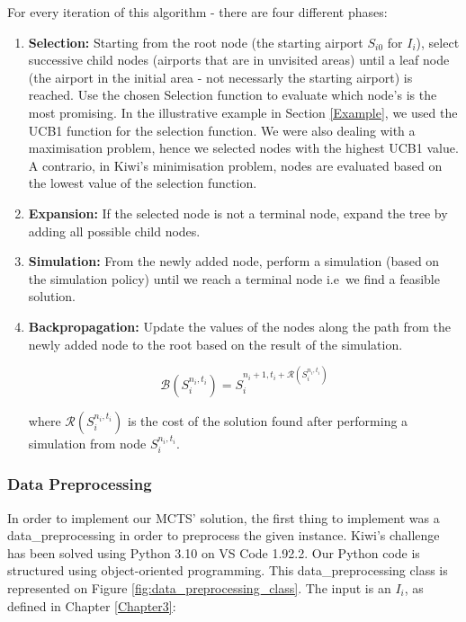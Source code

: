 For every iteration of this algorithm - there are four different phases:

\begin{enumerate}
    \item \textbf{Selection:} Starting from the root node (the starting airport $S_{i0}$ for $I_{i}$), select successive child nodes (airports that are in unvisited areas) until a leaf node (the airport in the initial area - not necessarly the starting airport) is reached. Use the chosen Selection function to evaluate which node's is the most promising. In the illustrative example in Section \ref{Example}, we used the UCB1 function for the selection function. We were also dealing with a maximisation problem, hence we selected nodes with the highest UCB1 value. A contrario, in Kiwi's minimisation problem,  nodes are evaluated based on the lowest value of the selection function.

    \item \textbf{Expansion:} If the selected node is not a terminal node, expand the tree by adding all possible child nodes.

    \item \textbf{Simulation:} From the newly added node, perform a simulation (based on the simulation policy) until we reach a terminal node i.e\ we find a feasible solution.

    \item \textbf{Backpropagation:} Update the values of the nodes along the path from the newly added node to the root based on the result of the simulation.

          \begin{equation}
              \mathcal{B}(S^{n_i,t_i}_i) = S^{n_i+1,t_i+\mathcal{R}(S^{n_i,t_i}_i)}_i
          \end{equation}

          where $\mathcal{R}(S^{n_i,t_i}_i)$ is the cost of the solution found after performing a simulation from node $S^{n_i,t_i}_i$.
\end{enumerate}


\newpage
\subsubsection{Data Preprocessing}

In order to implement our MCTS' solution, the first thing to implement was a data\_preprocessing  in order to preprocess the given instance.
Kiwi's challenge has been solved using Python 3.10 on VS Code 1.92.2. Our Python code is structured using object-oriented programming. This data\_preprocessing class is represented on Figure \ref{fig:data_preprocessing_class}.
The input is an  $I_i$, as defined in Chapter \ref{Chapter3}:

